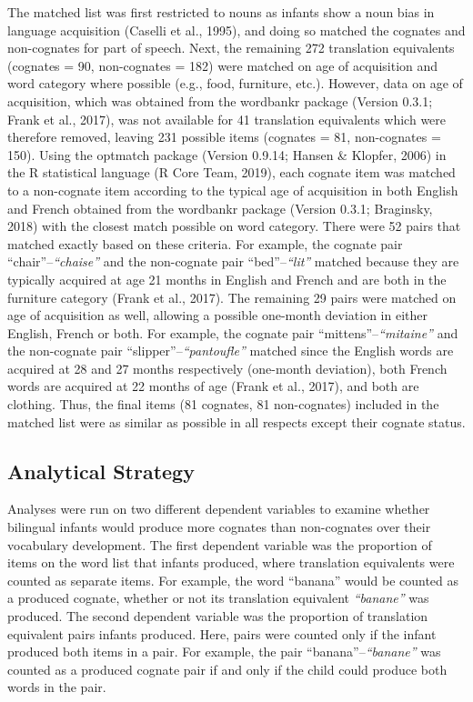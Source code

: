 \documentclass[
  english,
  ,man,floatsintext]{apa6}
\begin{document}
The matched list was first restricted to nouns as infants show a noun bias in language acquisition (Caselli et al., 1995), and doing so matched the cognates and non-cognates for part of speech. Next, the remaining 272 translation equivalents (cognates = 90, non-cognates = 182) were matched on age of acquisition and word category where possible (e.g., food, furniture, etc.). However, data on age of acquisition, which was obtained from the wordbankr package (Version 0.3.1; Frank et al., 2017), was not available for 41 translation equivalents which were therefore removed, leaving 231 possible items (cognates = 81, non-cognates = 150). Using the optmatch package (Version 0.9.14; Hansen \& Klopfer, 2006) in the R statistical language (R Core Team, 2019), each cognate item was matched to a non-cognate item according to the typical age of acquisition in both English and French obtained from the wordbankr package (Version 0.3.1; Braginsky, 2018) with the closest match possible on word category. There were 52 pairs that matched exactly based on these criteria. For example, the cognate pair ``chair''--\emph{``chaise''} and the non-cognate pair ``bed''--\emph{``lit''} matched because they are typically acquired at age 21 months in English and French and are both in the furniture category (Frank et al., 2017). The remaining 29 pairs were matched on age of acquisition as well, allowing a possible one-month deviation in either English, French or both. For example, the cognate pair ``mittens''--\emph{``mitaine''} and the non-cognate pair ``slipper''--\emph{``pantoufle''} matched since the English words are acquired at 28 and 27 months respectively (one-month deviation), both French words are acquired at 22 months of age (Frank et al., 2017), and both are clothing. Thus, the final items (81 cognates, 81 non-cognates) included in the matched list were as similar as possible in all respects except their cognate status.

\hypertarget{analytical-strategy}{%
\subsection{Analytical Strategy}\label{analytical-strategy}}

Analyses were run on two different dependent variables to examine whether bilingual infants would produce more cognates than non-cognates over their vocabulary development. The first dependent variable was the proportion of items on the word list that infants produced, where translation equivalents were counted as separate items. For example, the word ``banana'' would be counted as a produced cognate, whether or not its translation equivalent \emph{``banane''} was produced. The second dependent variable was the proportion of translation equivalent pairs infants produced. Here, pairs were counted only if the infant produced both items in a pair. For example, the pair ``banana''--\emph{``banane''} was counted as a produced cognate pair if and only if the child could produce both words in the pair.
\end{document}
